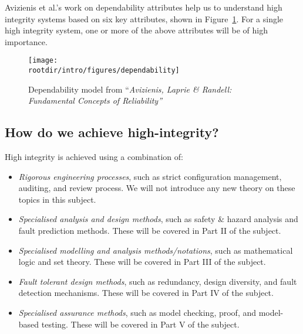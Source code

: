 Avizienis et al.'s work on dependability attributes help us to
understand high integrity systems based on six key attributes, shown in Figure~\ref{fig:intro:dependenability}. For a single high integrity system, one or more of the above attributes will be of high importance.

\begin{figure}
\centering
  \texttt{[image: \\rootdir/intro/figures/dependability]}
 \caption{Dependability model from ``\emph{Avizienis, Laprie \& Randell: Fundamental
    Concepts of Reliability''}}
 \label{fig:intro:dependenability}
\end{figure}



\subsection*{How do we achieve high-integrity?}

High integrity is achieved using a combination of:

\begin{itemize}

 \item {\em Rigorous engineering processes}, such as strict configuration management, auditing, and review process. We will not introduce any new theory on these topics in this subject.

 \item {\em Specialised analysis and design methods}, such as safety \& hazard analysis and fault prediction methods. These will be covered in Part II of the subject.

 \item {\em Specialised modelling and analysis methods/notations}, such as mathematical logic and set theory. These will be covered in Part III of the subject.

 \item {\em Fault tolerant design methods}, such as redundancy, design diversity, and fault detection mechanisms. These will be covered in Part IV of the subject.

 \item \emph{Specialised assurance methods}, such as model checking, proof, and model-based testing. These will be covered in Part V of the subject.

\end{itemize}

